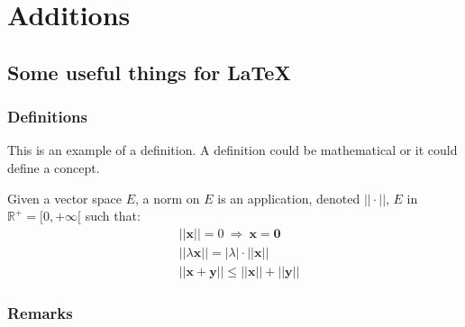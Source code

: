 \documentclass[11pt]{book} %
\begin{document}
\part{Additions}





\iffalse



\chapter{Some useful things for LaTeX}




\section{Definitions}

This is an example of a definition. A definition could be mathematical or it could define a concept.

\begin{definition}
Given a vector space $E$, a norm on $E$ is an application, denoted $||\cdot||$, $E$ in $\mathbb{R}^+=[0,+\infty[$ such that:
\begin{align}
& ||\mathbf{x}||=0\ \Rightarrow\ \mathbf{x}=\mathbf{0}\\
& ||\lambda \mathbf{x}||=|\lambda|\cdot ||\mathbf{x}||\\
& ||\mathbf{x}+\mathbf{y}||\leq ||\mathbf{x}||+||\mathbf{y}||
\end{align}
\end{definition}


\section{Remarks}
\end{document}
